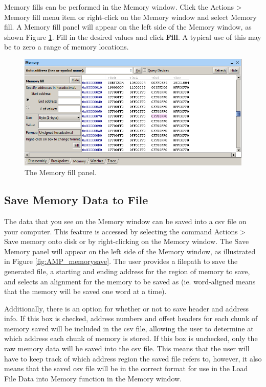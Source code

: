 \documentclass[11pt, twoside, pdftex]{article}
\begin{document}
Memory fills can be performed in the Memory window. Click the
{\sf Actions > Memory fill} menu item or right-click on the
Memory window and select {\sf Memory fill}. 
A {\sf Memory fill} panel will appear on the left side of the
Memory window, as shown Figure \ref{fig:AMP_memoryfill}. Fill in the desired values and 
click {\bf Fill}. A typical use of this may be to zero a range of memory locations.

\begin{figure}[H]
   \begin{center}
      \includegraphics[scale=0.7]{screenshots/figure42.png}
   \end{center}
   \caption{The Memory fill panel.} 
   \label{fig:AMP_memoryfill}
\end{figure}

\subsection{Save Memory Data to File}

The data that you see on the Memory window can be saved into a csv file 
on your computer. This feature is accessed by selecting the command 
{\sf Actions > Save memory onto disk} or by right-clicking on the
Memory window. The {\sf Save Memory} panel will appear on the left
side of the Memory window, as illustrated in Figure \ref{fig:AMP_memorysave}.
The user provides a filepath to save the generated file, a starting 
and ending address for the region of memory to save, and selects an
alignment for the memory to be saved as (ie. word-aligned means that
the memory will be saved one word at a time). 

Additionally, there is 
an option for whether or not to save header and address info. If this box
is checked, address numbers and offset headers for each chunk of memory
saved will be included in the csv file, allowing the user to determine
at which address each chunk of memory is stored. If this box is unchecked,
only the raw memory data will be saved into the csv file. This means that 
the user will have to keep track of which address region the saved file 
refers to, however, it also means that the saved csv file will be in the
correct format for use in the {\sf Load File Data into Memory} function in 
the Memory window.
\end{document}
